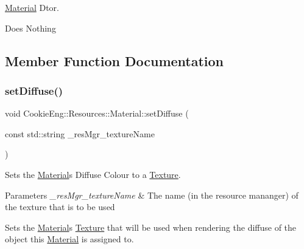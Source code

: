 \hyperlink{class_cookie_eng_1_1_resources_1_1_material}{Material} Dtor. 

Does Nothing 

\subsection{Member Function Documentation}
\mbox{\label{class_cookie_eng_1_1_resources_1_1_material_a833ddee7037c0cef8c8c389e64f3d76b}} 
\subsubsection{\texorpdfstring{set\+Diffuse()}{setDiffuse()}\hspace{0.1cm}{\footnotesize\ttfamily [1/2]}}
{\footnotesize\ttfamily void Cookie\+Eng\+::\+Resources\+::\+Material\+::set\+Diffuse (\begin{DoxyParamCaption}\item[{const std\+::string}]{\+\_\+res\+Mgr\+\_\+texture\+Name }\end{DoxyParamCaption})}



Sets the \hyperlink{class_cookie_eng_1_1_resources_1_1_material}{Material}\textquotesingle{}s Diffuse Colour to a \hyperlink{class_cookie_eng_1_1_resources_1_1_texture}{Texture}. 


\begin{DoxyParams}{Parameters}
{\em \+\_\+res\+Mgr\+\_\+texture\+Name} & The name (in the resource mananger) of the texture that is to be used\\
\hline
\end{DoxyParams}
Sets the \hyperlink{class_cookie_eng_1_1_resources_1_1_material}{Material}\textquotesingle{}s \hyperlink{class_cookie_eng_1_1_resources_1_1_texture}{Texture} that will be used when rendering the diffuse of the object this \hyperlink{class_cookie_eng_1_1_resources_1_1_material}{Material} is assigned to. \mbox{\label{class_cookie_eng_1_1_resources_1_1_material_abd2e0f6b5a0ea9987cc545859d8cc14e}} 

